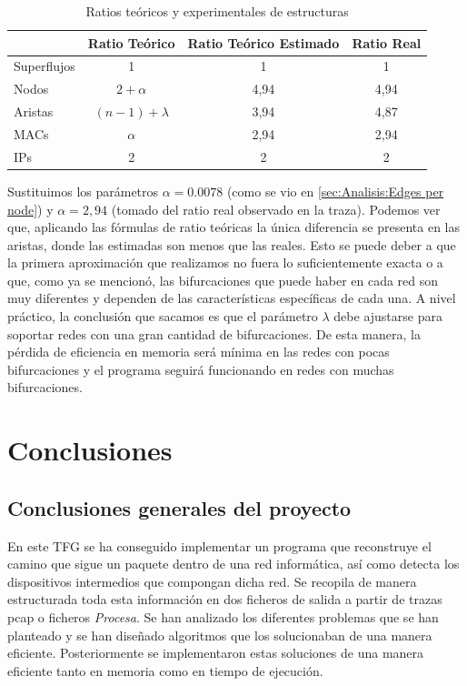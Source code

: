 \documentclass[twoside, 12pt]{epstfg}
\begin{document}
\begin{table}[hbtp]
	\centering
	\begin{tabular}{lccc}
		\toprule & \textbf{Ratio Teórico}  & \textbf{Ratio Teórico Estimado} & \textbf{Ratio Real} \\ 
		\midrule
		Superflujos & 1 & 1 & 1 \\
		Nodos & $2+\alpha$ & 4,94 & 4,94 \\
		Aristas & $(n-1)+\lambda$ & 3,94 & 4,87 \\
		MACs & $\alpha$ & 2,94 & 2,94 \\
		IPs & 2 & 2 & 2 \\ 
		\bottomrule
	\end{tabular}
	\caption{Ratios teóricos y experimentales de estructuras}
	\label{tab:Pruebas:Ratios estructuras}
\end{table}

Sustituimos los parámetros $\alpha = 0.0078$ (como se vio en \ref{sec:Analisis:Edges per node}) y $\alpha = 2,94$ (tomado del ratio real observado en la traza). Podemos ver que, aplicando las fórmulas de ratio teóricas la única diferencia se presenta en las aristas, donde las estimadas son menos que las reales. Esto se puede deber a que la primera aproximación que realizamos no fuera lo suficientemente exacta o a que, como ya se mencionó, las bifurcaciones que puede haber en cada red son muy diferentes y dependen de las características específicas de cada una. A nivel práctico, la conclusión que sacamos es que el parámetro $\lambda$ debe ajustarse para soportar redes con una gran cantidad de bifurcaciones. De esta manera, la pérdida de eficiencia en memoria será mínima en las redes con pocas bifurcaciones y el programa seguirá funcionando en redes con muchas bifurcaciones.

\chapter{Conclusiones}
\label{chap:Conclusiones}

\section{Conclusiones generales del proyecto}

En este TFG se ha conseguido implementar un programa que reconstruye el camino que sigue un paquete dentro de una red informática, así como detecta los dispositivos intermedios que compongan dicha red. Se recopila de manera estructurada toda esta información en dos ficheros de salida a partir de trazas pcap o ficheros \textit{Procesa}. Se han analizado los diferentes problemas que se han planteado y se han diseñado algoritmos que los solucionaban de una manera eficiente. Posteriormente se implementaron estas soluciones de una manera eficiente tanto en memoria como en tiempo de ejecución.
\end{document}
